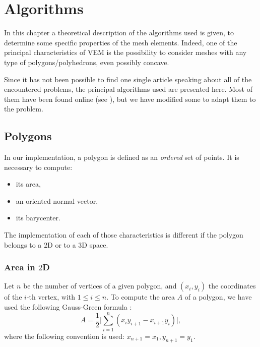 \newpage
\section{Algorithms}
In this chapter a theoretical description of the algorithms used is given, to determine some specific properties of the mesh elements. Indeed, one of the principal characteristics of VEM is the possibility to consider meshes with any type of polygons/polyhedrons, even possibly concave. 

Since it has not been possible to find one single article speaking about all of the encountered problems, the principal algorithms used are presented here. Most of them have been found online (see \cite{bourke1988calculating}\cite{newell}\cite{rayCasting}), but we have modified some to adapt them to the problem.

\subsection{Polygons}\label{polygons}
In our implementation, a polygon is defined as an \textit{ordered} set of points. It is necessary to compute:
\begin{itemize}
\item its area,
\item an oriented normal vector,
\item its barycenter.
\end{itemize}
The implementation of each of those characteristics is different if the polygon belongs to a $2$D or to a $3$D space.

\subsubsection{Area in $2$D}\label{area2d}
Let $n$ be the number of vertices of a given polygon, and $(x_i,y_i)$ the coordinates of the $i$-th vertex, with $1\leq i\leq n$. To compute the area $A$ of a polygon, we have used the following Gauss-Green formula \cite{bourke1988calculating}:
$$ A=\frac{1}{2} \bigg | \sum_{i=1}^n (x_iy_{i+1}-x_{i+1}y_i) \bigg
|,$$
where the following convention is used: $x_{n+1}=x_1,y_{n+1}=y_1$.

